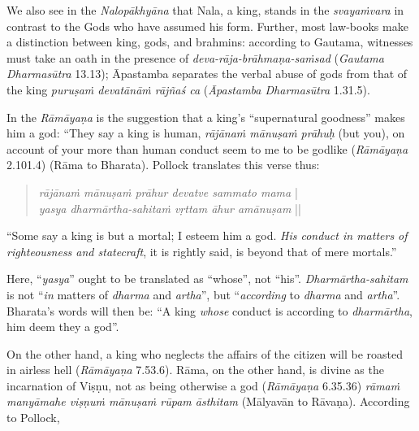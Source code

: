 We also see in the {\sl Nalopākhyāna} that Nala, a king, stands in the {\sl svayaṁvara} in contrast to the Gods who have assumed his form. Further, most law-books make a distinction between king, gods, and brahmins: according to Gautama, witnesses must take an oath in the presence of {\sl deva-rāja-brāhmaṇa-saṁsad} ({\sl Gautama Dharmasūtra} 13.13); Āpastamba separates the verbal abuse of gods from that of the king {\sl puruṣaṁ devatānāṁ rājñaś ca} ({\sl Āpastamba Dharmasūtra} 1.31.5). 

In the {\sl Rāmāyaṇa} is the suggestion that a king’s “supernatural goodness” makes him a god: “They say a king is human, {\sl rājānaṁ mānuṣaṁ prāhuḥ} (but you), on account of your more than human conduct seem to me to be godlike ({\sl Rāmāyaṇa} 2.101.4) (Rāma to Bharata). Pollock translates this verse thus:  
\begin{quote}
{{\sl rājānaṁ mānuṣaṁ prāhur devatve sammato mama}}\label{verse32} |\\
{\sl yasya dharmārtha-sahitaṁ vṛttam āhur amānuṣam} || 
\end{quote}

\begin{myquote}
“Some say a king is but a mortal; I esteem him a god. {\sl His conduct in matters of righteousness and statecraft}, it is rightly said, is beyond that of mere mortals.” 
\end{myquote}

Here, “{\sl yasya}” ought to be translated as “whose”, not “his”. {\sl Dharmārtha-sahitam} is not “{\sl in} matters of {\sl dharma} and {\sl artha}'', but ``{\sl according} to {\sl dharma} and {\sl artha}''. Bharata’s words will then be: “A king {\sl whose} conduct is according to {\sl dharmārtha}, him deem they a god”. 

On the other hand, a king who neglects the affairs of the citizen will be roasted in airless hell ({\sl Rāmāyaṇa} 7.53.6). Rāma, on the other hand, is divine as the incarnation of Viṣṇu, not as being otherwise a god ({\sl Rāmāyaṇa} 6.35.36) {\sl rāmaṁ manyāmahe viṣṇuṁ mānuṣaṁ rūpam āsthitam}\label{verse43} (Mālyavān to Rāvaṇa). According to Pollock, 

